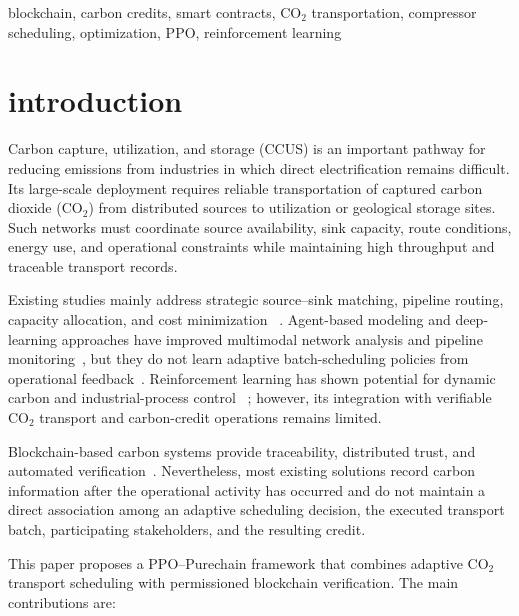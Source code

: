 \documentclass[conference]{IEEEtran}
\begin{document}
\begin{IEEEkeywords}
blockchain, carbon credits, smart contracts, CO$_2$ transportation, compressor scheduling, optimization, PPO, reinforcement learning 
\end{IEEEkeywords}

\vspace{-0.4cm}
\section{\textbf{introduction}}
\label{sec:introduction}

\vspace{-0.3cm}
Carbon capture, utilization, and storage (CCUS) is an important pathway for reducing emissions from industries in which direct electrification remains
difficult. Its large-scale deployment requires reliable transportation of captured carbon dioxide (CO$_2$) from distributed sources to utilization or
geological storage sites. Such networks must coordinate source availability, sink capacity, route conditions, energy use, and operational constraints while maintaining high throughput and traceable transport records.

Existing studies mainly address strategic source--sink matching, pipeline routing, capacity allocation, and cost minimization
~\cite{zhang2022advances,velasco2024optimizing}. Agent-based modeling and deep-learning approaches have improved multimodal network analysis and pipeline monitoring~\cite{uddin2025agent,kim2024real}, but they do not learn adaptive batch-scheduling policies from operational feedback~\cite{ajakwe2026predblock}. Reinforcement learning has
shown potential for dynamic carbon and industrial-process control ~\cite{schulman2017ppo,li2024integrating,raven2024machine}; however, its integration with verifiable CO$_2$ transport and carbon-credit operations
remains limited.

Blockchain-based carbon systems provide traceability, distributed trust, and automated verification~\cite{muzumdar2022permissioned,
suta2023systematic,luo2024carbon}. Nevertheless, most existing solutions record carbon information after the operational activity has occurred and do not maintain a direct association among an adaptive scheduling decision, the executed transport batch, participating stakeholders, and the resulting credit.

This paper proposes a PPO--Purechain framework that combines adaptive CO$_2$ transport scheduling with permissioned blockchain verification. The main
contributions are:
\end{document}
